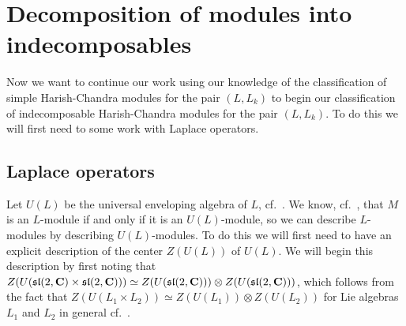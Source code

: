 \section{Decomposition of modules into indecomposables}

Now we want to continue our work using our knowledge of the classification of simple Harish-Chandra modules for the pair $(L,L_k)$ to begin our classification of indecomposable Harish-Chandra modules for the pair $(L,L_k)$. To do this we will first need to some work with Laplace operators.

\subsection{Laplace operators}

Let $U(L)$ be the universal enveloping algebra of $L$, cf.\ \cite[Appendix~E]{jantzen}. We know, cf.\ \cite[p.~E-9]{jantzen}, that $M$ is an $L$-module if and only if it is an $U(L)$-module, so we can describe $L$-modules by describing $U(L)$-modules. To do this we will first need to have an explicit description of the center $Z(U(L))$ of $U(L)$. We will begin this description by first noting that $Z(U(\mathfrak{sl}(2,\mathbf{C})\times \mathfrak{sl}(2,\mathbf{C})))\simeq Z(U(\mathfrak{sl}(2,\mathbf{C})))\otimes Z(U(\mathfrak{sl}(2,\mathbf{C})))$, which follows from the fact that $Z(U(L_1\times L_2))\simeq Z(U(L_1))\otimes Z(U(L_2))$ for Lie algebras $L_1$ and $L_2$ in general cf.\ .

